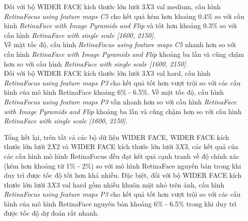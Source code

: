 {    \noindent
    Đối với bộ WIDER FACE kích thước lớn lưới $3 X 3$ val medium, cấu hình \textit{RetinaFocus using feature maps C5} cho kết quả kém hơn khoảng 0.4\% so với cấu hình \textit{RetinaFace with Image Pyramids and Flip} và tốt hơn khoảng 0.3\% so với cấu hình \textit{RetinaFace with single scale [1600, 2150]}. \\
    Về mặt tốc độ, cấu hình \textit{RetinaFocus using feature maps C5} nhanh hơn so với cấu hình \textit{RetinaFace with Image Pyramids and Flip} khoảng ba lần và cũng chậm hơn so với cấu hình \textit{RetinaFace with single scale [1600, 2150]}. \\
    Đối với bộ WIDER FACE kích thước lớn lưới $3 X 3$ val hard, cấu hình \textit{RetinaFocus using feature maps P3} cho kết quả tốt hơn vượt trội so với các cấu hình của mô hình RetinaFace khoảng 6\% - 6.5\%.
    Về mặt tốc độ, cấu hình \textit{RetinaFocus using feature maps P3} vẫn nhanh hơn so với cấu hình \textit{RetinaFace with Image Pyramids and Flip} khoảng ba lần và cũng chậm hơn so với cấu hình \textit{RetinaFace with single scale [1600, 2150]}.

    \noindent
    Tổng kết lại, trên tất cả các bộ dữ liệu WIDER FACE, WIDER FACE kích thước lớn lưới $2 X 2$ và WIDER FACE kích thước lớn lưới $3 X 3$, các kết quả của các cấu hình mô hình RetinaFocus đều đạt kết quả cạnh tranh về độ chính xác (kém hơn khoảng từ 1\% - 2\%) so với mô hình RetinaFace nguyên bản trong khi duy trì được tốc độ tốt hơn khá nhiều.
    Đặc biệt, đối với bộ WIDER FACE kích thước lớn lưới $3 X 3$ val hard gồm nhiều khuôn mặt nhỏ trên ảnh, cấu hình \textit{RetinaFocus using feature maps P3} cho kết quả tốt hơn vượt trội so với các cấu hình của mô hình RetinaFace nguyên bản khoảng 6\% - 6.5\% trong khi duy trì được tốc độ dự đoán rất nhanh.
}